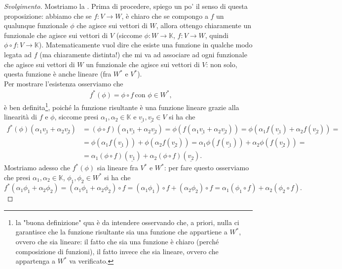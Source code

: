 \begin{proof}[Svolgimento]
    Mostriamo la . Prima di procedere, spiego un po' il senso di questa proposizione: abbiamo che se $f: V \to W$, è chiaro che se compongo a $f$ un qualunque funzionale $\phi$ che agisce sui vettori di $W$, allora ottengo chiaramente un funzionale che agisce sui vettori di $V$ (siccome $\phi: W \to \mathbb{K}$, $f: V \to W$, quindi $\phi \circ f: V \to \mathbb{K}$). Matematicamente vuol dire che esiste una funzione in qualche modo legata ad $f$ (ma chiaramente distinta!) che mi va ad associare
    ad ogni funzionale che agisce sui vettori di $W$ un funzionale che agisce sui vettori di $V$: non solo, questa funzione è anche lineare (fra $W^\ast$ e $V^\ast$). \\
    Per mostrare l'esistenza osserviamo che
    \begin{align}
        &f^\ast(\phi) = \phi \circ f \, \text{con } \phi \in W^\ast,
    \end{align}
    è ben definita\footnote{la "buona definizione" qua è da intendere osservando che, a priori, nulla ci garantisce che la funzione risultante sia una funzione che appartiene a $W^\ast$, ovvero che sia lineare: il fatto che sia una funzione è chiaro (perché composizione di funzioni), il fatto invece che sia lineare, ovvero che appartenga a $W^\ast$ va verificato.}, poiché la funzione risultante è una funzione lineare grazie alla linearità di $f$ e $\phi$, siccome presi $\alpha_1, \alpha_2 \in \mathbb{K}$ e $\underline{v_1}, \underline{v_2} \in V$ si ha che
    \begin{align}
        f^\ast(\phi)(\alpha_1 \underline{v_1} + \alpha_2 \underline{v_2}) &= (\phi \circ f)(\alpha_1 \underline{v_1} + \alpha_2 \underline{v_2}) = \phi(f(\alpha_1 \underline{v_1} + \alpha_2 \underline{v_2})) = \phi(\alpha_1 f(\underline{v_1}) + \alpha_2 f(\underline{v_2})) = & \\ 
        &= \phi(\alpha_1 f(\underline{v_1})) + \phi(\alpha_2 f(\underline{v_2})) = \alpha_1 \phi(f(\underline{v_1})) + \alpha_2 \phi(f(\underline{v_2})) = & \\
        &= \alpha_1 (\phi \circ f)(\underline{v_1}) + \alpha_2 (\phi \circ f)(\underline{v_2}). &
    \end{align}
    Mostriamo adesso che $f^\ast(\phi)$ sia lineare fra $V^\ast$ e $W^\ast$: per fare questo osserviamo che presi $\alpha_1, \alpha_2 \in \mathbb{K}$, $\phi_1, \phi_2 \in W^\ast$ si ha che
    $$
        f^\ast(\alpha_1 \phi_1 + \alpha_2 \phi_2) = (\alpha_1 \phi_1 + \alpha_2 \phi_2) \circ f = (\alpha_1 \phi_1) \circ f + (\alpha_2 \phi_2) \circ f = \alpha_1 (\phi_1 \circ f) + \alpha_2 (\phi_2 \circ f).
$$
\end{proof}
